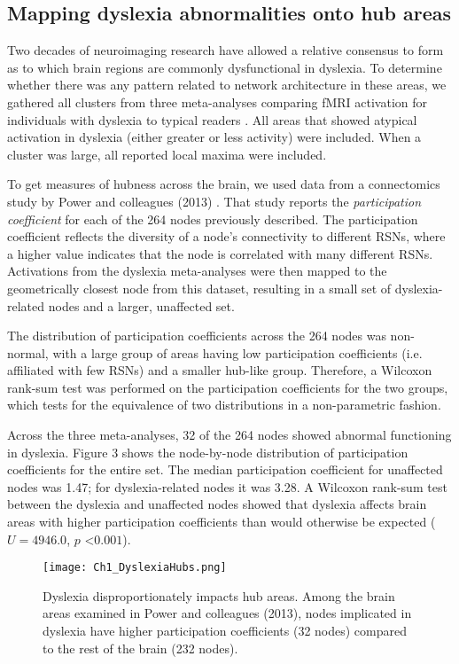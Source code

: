 \subsection{Mapping dyslexia abnormalities onto hub areas}
Two decades of neuroimaging research have allowed a relative consensus to form as to which brain regions are commonly dysfunctional in dyslexia. To determine whether there was any pattern related to network architecture in these areas, we gathered all clusters from three meta-analyses comparing fMRI activation for individuals with dyslexia to typical readers \cite{Maisog2008, Richlan2009, Paulesu2014}. All areas that showed atypical activation in dyslexia (either greater or less activity) were included. When a cluster was large, all reported local maxima were included. 

To get measures of hubness across the brain, we used data from a connectomics study by Power and colleagues (2013) \cite{Power2013}. That study reports the \textit{participation coefficient} for each of the 264 nodes previously described. The participation coefficient reflects the diversity of a node's connectivity to different RSNs, where a higher value indicates that the node is correlated with many different RSNs. Activations from the dyslexia meta-analyses were then mapped to the geometrically closest node from this dataset, resulting in a small set of dyslexia-related nodes and a larger, unaffected set.

The distribution of participation coefficients across the 264 nodes was non-normal, with a large group of areas having low participation coefficients (i.e. affiliated with few RSNs) and a smaller hub-like group. Therefore, a Wilcoxon rank-sum test was performed on the participation coefficients for the two groups, which tests for the equivalence of two distributions in a non-parametric fashion.

Across the three meta-analyses, 32 of the 264 nodes showed abnormal functioning in dyslexia. Figure 3 shows the node-by-node distribution of participation coefficients for the entire set. The median participation coefficient for unaffected nodes was 1.47; for dyslexia-related nodes it was 3.28. A Wilcoxon rank-sum test between the dyslexia and unaffected nodes showed that dyslexia affects brain areas with higher participation coefficients than would otherwise be expected ($U = 4946.0$, $p$ \textless $0.001$). 

\begin{figure}[h!]
\centering
\texttt{[image: Ch1\_DyslexiaHubs.png]}
    \caption[Dyslexia disproportionately impacts hub areas.]{Dyslexia disproportionately impacts hub areas. Among the brain areas examined in Power and colleagues (2013), nodes implicated in dyslexia have higher participation coefficients (32 nodes) compared to the rest of the brain (232 nodes).}
\label{fig:texlogo}
\end{figure}


